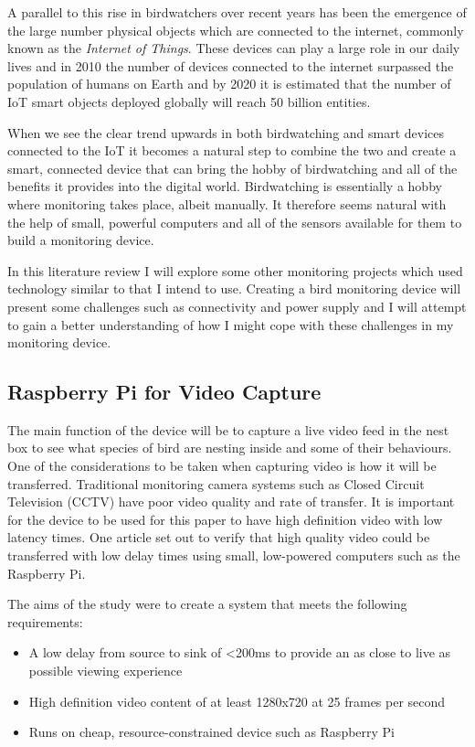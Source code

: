\documentclass[10pt,a4paper]{article}
\begin{document}
A parallel to this rise in birdwatchers over recent years has been the emergence of the large number physical objects which are connected to the internet, commonly known as the \textit{Internet of Things}. These devices can play a large role in our daily lives and in 2010 the number of devices connected to the internet surpassed the population of humans on Earth\cite{AlFuqaha2015} and by 2020 it is estimated that the number of IoT smart objects deployed globally will reach 50 billion entities\cite{Arumuga2017}. 

When we see the clear trend upwards in both birdwatching and smart devices connected to the IoT it becomes a natural step to combine the two and create a smart, connected device that can bring the hobby of birdwatching and all of the benefits it provides into the digital world. Birdwatching is essentially a hobby where monitoring takes place, albeit manually. It therefore seems natural with the help of small, powerful computers and all of the sensors available for them to build a monitoring device. 

In this literature review I will explore some other monitoring projects which used technology similar to that I intend to use. Creating a bird monitoring device will present some challenges such as connectivity and power supply and I will attempt to gain a better understanding of how I might cope with these challenges in my monitoring device.
\subsection{Raspberry Pi for Video Capture}
The main function of the device will be to capture a live video feed in the nest box to see what species of bird are nesting inside and some of their behaviours. One of the considerations to be taken when capturing video is how it will be transferred. Traditional monitoring camera systems such as Closed Circuit Television (CCTV) have poor video quality and rate of transfer. It is important for the device to be used for this paper to have high definition video with low latency times. One article\cite{Jennehag2016} set out to verify that high quality video could be transferred with low delay times using small, low-powered computers such as the Raspberry Pi. 

The aims of the study were to create a system that meets the following requirements:
\begin{itemize}
\item A low delay from source to sink of \textless200ms to provide an as close to live as possible viewing experience
\item High definition video content of at least 1280x720 at 25 frames per second
\item Runs on cheap, resource-constrained device such as Raspberry Pi
\end{itemize}
\end{document}

